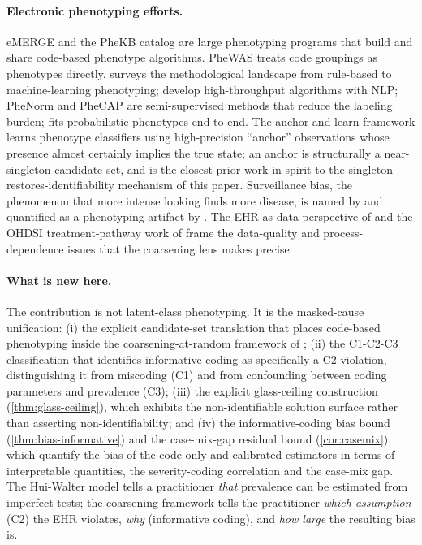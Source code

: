 \paragraph{Electronic phenotyping efforts.} eMERGE
\citep{gottesman2013emerge,newton2013validation} and the PheKB catalog
\citep{kirby2016phekb} are large phenotyping programs that build and
share code-based phenotype algorithms. PheWAS \citep{denny2010phewas}
treats code groupings as phenotypes directly.
\citet{banda2018phenotyping} surveys the methodological landscape from
rule-based to machine-learning phenotyping; \citet{liao2015highthroughput}
develop high-throughput algorithms with NLP; PheNorm
\citep{yu2018phenorm} and PheCAP \citep{zhang2019phecap} are
semi-supervised methods that reduce the labeling burden;
\citet{pivovarov2015learning} fits probabilistic phenotypes
end-to-end. The anchor-and-learn framework \citep{halpern2016anchor}
learns phenotype classifiers using high-precision ``anchor''
observations whose presence almost certainly implies the true state;
an anchor is structurally a near-singleton candidate set, and
\citet{halpern2016anchor} is the closest prior work in spirit to the
singleton-restores-identifiability mechanism of this paper.
Surveillance bias, the phenomenon that more intense looking finds more
disease, is named by \citet{haut2011surveillance} and quantified as a
phenotyping artifact by \citet{carrell2014surveillance}. The
EHR-as-data perspective of \citet{hripcsak2013correlating} and the
OHDSI treatment-pathway work of \citet{hripcsak2016characterizing}
frame the data-quality and process-dependence issues that the
coarsening lens makes precise.

\paragraph{What is new here.} The contribution is not latent-class
phenotyping. It is the masked-cause unification: (i) the explicit
candidate-set translation that places code-based phenotyping inside the
coarsening-at-random framework of \citet{towell2026masked}; (ii) the
C1-C2-C3 classification that identifies informative coding as
specifically a C2 violation, distinguishing it from miscoding (C1) and
from confounding between coding parameters and prevalence (C3); (iii)
the explicit glass-ceiling construction (\cref{thm:glass-ceiling}),
which exhibits the non-identifiable solution surface rather than
asserting non-identifiability; and (iv) the informative-coding bias
bound (\cref{thm:bias-informative}) and the case-mix-gap residual bound
(\cref{cor:casemix}), which quantify the bias of the code-only and
calibrated estimators in terms of interpretable quantities, the
severity-coding correlation and the case-mix gap. The Hui-Walter model
tells a practitioner \emph{that} prevalence can be estimated from
imperfect tests; the coarsening framework tells the practitioner
\emph{which assumption} (C2) the EHR violates, \emph{why} (informative
coding), and \emph{how large} the resulting bias is.

